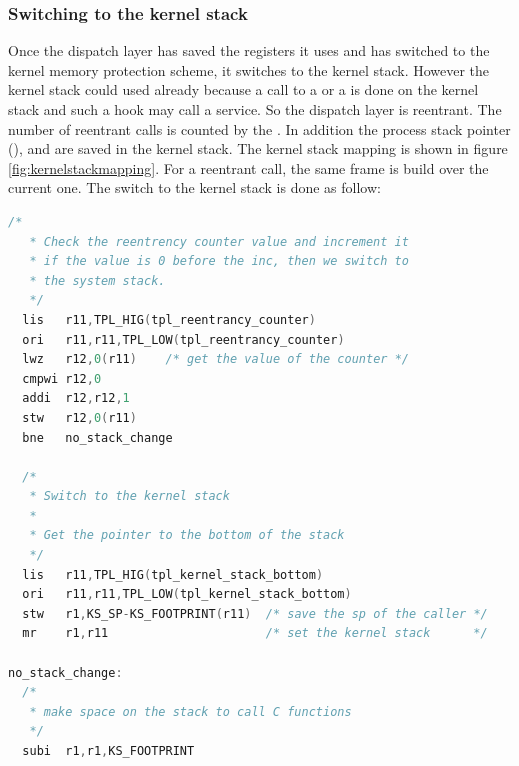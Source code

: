 \subsubsection{Switching to the kernel stack}

Once the dispatch layer has saved the registers it uses and has switched to the kernel memory protection scheme, it switches to the kernel stack. However the kernel stack could used already because a call to a  or a  is done on the kernel stack and such a hook may call a service. So the dispatch layer is reentrant. The number of reentrant calls is counted by the . In addition the process stack pointer (),  and  are saved in the kernel stack. The kernel stack mapping is shown in figure \ref{fig:kernelstackmapping}. For a reentrant call, the same frame is build over the current one. The switch to the kernel stack is done as follow:

\begin{lstlisting}[language=C]
  /*
   * Check the reentrency counter value and increment it
   * if the value is 0 before the inc, then we switch to
   * the system stack.
   */
  lis   r11,TPL_HIG(tpl_reentrancy_counter)
  ori   r11,r11,TPL_LOW(tpl_reentrancy_counter)
  lwz   r12,0(r11)    /* get the value of the counter */
  cmpwi r12,0
  addi  r12,r12,1
  stw   r12,0(r11)
  bne   no_stack_change
  
  /*
   * Switch to the kernel stack
   *
   * Get the pointer to the bottom of the stack
   */  
  lis   r11,TPL_HIG(tpl_kernel_stack_bottom)
  ori   r11,r11,TPL_LOW(tpl_kernel_stack_bottom)
  stw   r1,KS_SP-KS_FOOTPRINT(r11)  /* save the sp of the caller */
  mr    r1,r11                      /* set the kernel stack      */
  
no_stack_change:
  /*
   * make space on the stack to call C functions
   */
  subi  r1,r1,KS_FOOTPRINT
\end{lstlisting}

